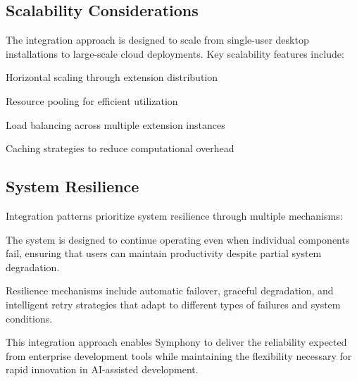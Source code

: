 \subsection*{Scalability Considerations}

The integration approach is designed to scale from single-user desktop installations to large-scale cloud deployments. Key scalability features include:

\begin{compactlist}
    \item Horizontal scaling through extension distribution
    \item Resource pooling for efficient utilization
    \item Load balancing across multiple extension instances
    \item Caching strategies to reduce computational overhead
\end{compactlist}

\subsection*{System Resilience}

Integration patterns prioritize system resilience through multiple mechanisms:

\begin{alertbox}
The system is designed to continue operating even when individual components fail, ensuring that users can maintain productivity despite partial system degradation.
\end{alertbox}

Resilience mechanisms include automatic failover, graceful degradation, and intelligent retry strategies that adapt to different types of failures and system conditions.

This integration approach enables Symphony to deliver the reliability expected from enterprise development tools while maintaining the flexibility necessary for rapid innovation in AI-assisted development.
